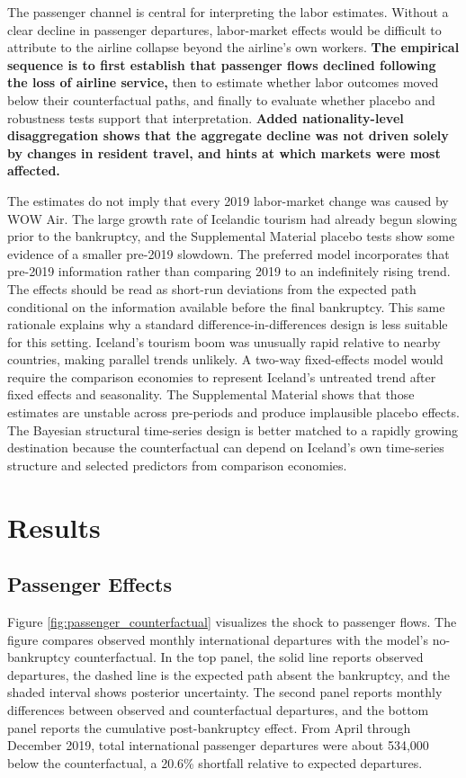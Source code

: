 \documentclass[12pt]{article}
\begin{document}
The passenger channel is central for interpreting the labor estimates. Without a clear decline in passenger departures, labor-market effects would be difficult to attribute to the airline collapse beyond the airline's own workers. \textbf{The empirical sequence is to first establish that passenger flows declined following the loss of airline service,} then to estimate whether labor outcomes moved below their counterfactual paths, and finally to evaluate whether placebo and robustness tests support that interpretation. \textbf{Added nationality-level disaggregation shows that the aggregate decline was not driven solely by changes in resident travel, and hints at which markets were most affected.}

The estimates do not imply that every 2019 labor-market change was caused by WOW Air. The large growth rate of Icelandic tourism had already begun slowing prior to the bankruptcy, and the Supplemental Material placebo tests show some evidence of a smaller pre-2019 slowdown. The preferred model incorporates that pre-2019 information rather than comparing 2019 to an indefinitely rising trend. The effects should be read as short-run deviations from the expected path conditional on the information available before the final bankruptcy. This same rationale explains why a standard difference-in-differences design is less suitable for this setting. Iceland's tourism boom was unusually rapid relative to nearby countries, making parallel trends unlikely. A two-way fixed-effects model would require the comparison economies to represent Iceland's untreated trend after fixed effects and seasonality. The Supplemental Material shows that those estimates are unstable across pre-periods and produce implausible placebo effects. The Bayesian structural time-series design is better matched to a rapidly growing destination because the counterfactual can depend on Iceland's own time-series structure and selected predictors from comparison economies.

\section{Results}\label{sec:results}

\subsection{Passenger Effects}\label{sec:passenger_access}

Figure \ref{fig:passenger_counterfactual} visualizes the shock to passenger flows. The figure compares observed monthly international departures with the model's no-bankruptcy counterfactual. In the top panel, the solid line reports observed departures, the dashed line is the expected path absent the bankruptcy, and the shaded interval shows posterior uncertainty. The second panel reports monthly differences between observed and counterfactual departures, and the bottom panel reports the cumulative post-bankruptcy effect. From April through December 2019, total international passenger departures were about 534,000 below the counterfactual, a 20.6\% shortfall relative to expected departures.
\end{document}
